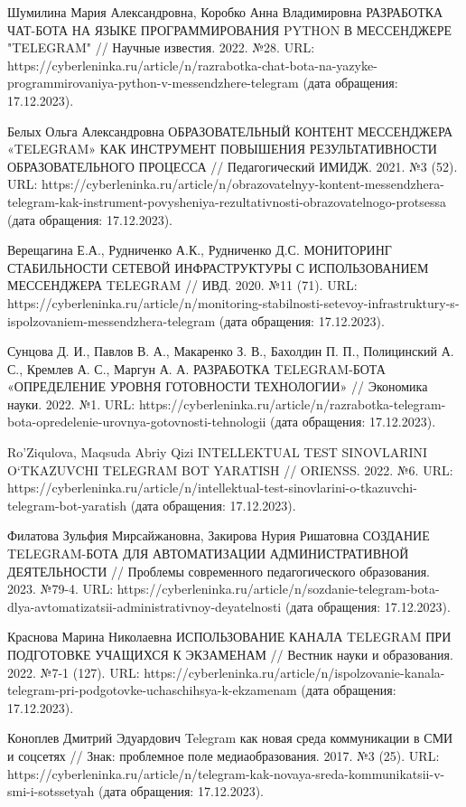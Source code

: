 \documentclass{article}
\begin{document}
Шумилина Мария Александровна, Коробко Анна Владимировна РАЗРАБОТКА ЧАТ-БОТА НА ЯЗЫКЕ ПРОГРАММИРОВАНИЯ PYTHON В МЕССЕНДЖЕРЕ "TELEGRAM" // Научные известия. 2022. №28. URL: https://cyberleninka.ru/article/n/razrabotka-chat-bota-na-yazyke-programmirovaniya-python-v-messendzhere-telegram (дата обращения: 17.12.2023).

Белых Ольга Александровна ОБРАЗОВАТЕЛЬНЫЙ КОНТЕНТ МЕССЕНДЖЕРА «TELEGRAM» КАК ИНСТРУМЕНТ ПОВЫШЕНИЯ РЕЗУЛЬТАТИВНОСТИ ОБРАЗОВАТЕЛЬНОГО ПРОЦЕССА // Педагогический ИМИДЖ. 2021. №3 (52). URL: https://cyberleninka.ru/article/n/obrazovatelnyy-kontent-messendzhera-telegram-kak-instrument-povysheniya-rezultativnosti-obrazovatelnogo-protsessa (дата обращения: 17.12.2023).

Верещагина Е.А., Рудниченко А.К., Рудниченко Д.С. МОНИТОРИНГ СТАБИЛЬНОСТИ СЕТЕВОЙ ИНФРАСТРУКТУРЫ С ИСПОЛЬЗОВАНИЕМ МЕССЕНДЖЕРА TELEGRAM // ИВД. 2020. №11 (71). URL: https://cyberleninka.ru/article/n/monitoring-stabilnosti-setevoy-infrastruktury-s-ispolzovaniem-messendzhera-telegram (дата обращения: 17.12.2023).

Сунцова Д. И., Павлов В. А., Макаренко З. В., Бахолдин П. П., Полицинский А. С., Кремлев А. С., Маргун А. А. РАЗРАБОТКА TELEGRAM-БОТА «ОПРЕДЕЛЕНИЕ УРОВНЯ ГОТОВНОСТИ ТЕХНОЛОГИИ» // Экономика науки. 2022. №1. URL: https://cyberleninka.ru/article/n/razrabotka-telegram-bota-opredelenie-urovnya-gotovnosti-tehnologii (дата обращения: 17.12.2023).

Ro’Ziqulova, Maqsuda Abriy Qizi INTELLEKTUAL TEST SINOVLARINI O‘TKAZUVCHI TELEGRAM BOT YARATISH // ORIENSS. 2022. №6. URL: https://cyberleninka.ru/article/n/intellektual-test-sinovlarini-o-tkazuvchi-telegram-bot-yaratish (дата обращения: 17.12.2023).

Филатова Зульфия Мирсайжановна, Закирова Нурия Ришатовна СОЗДАНИЕ TELEGRAM-БОТА ДЛЯ АВТОМАТИЗАЦИИ АДМИНИСТРАТИВНОЙ ДЕЯТЕЛЬНОСТИ // Проблемы современного педагогического образования. 2023. №79-4. URL: https://cyberleninka.ru/article/n/sozdanie-telegram-bota-dlya-avtomatizatsii-administrativnoy-deyatelnosti (дата обращения: 17.12.2023).

Краснова Марина Николаевна ИСПОЛЬЗОВАНИЕ КАНАЛА TELEGRAM ПРИ ПОДГОТОВКЕ УЧАЩИХСЯ К ЭКЗАМЕНАМ // Вестник науки и образования. 2022. №7-1 (127). URL: https://cyberleninka.ru/article/n/ispolzovanie-kanala-telegram-pri-podgotovke-uchaschihsya-k-ekzamenam (дата обращения: 17.12.2023).

Коноплев Дмитрий Эдуардович Telegram как новая среда коммуникации в СМИ и соцсетях // Знак: проблемное поле медиаобразования. 2017. №3 (25). URL: https://cyberleninka.ru/article/n/telegram-kak-novaya-sreda-kommunikatsii-v-smi-i-sotssetyah (дата обращения: 17.12.2023).
\end{document}
